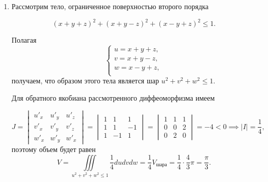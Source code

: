 \documentclass[../../main.tex]{subfiles}
\begin{document}
\begin{examples}
\begin{enumerate}
			\item Рассмотрим тело, ограниченное поверхностью второго порядка
			
			\[(x + y + z)^2 + (x + y - z)^2 + (x - y + z)^2 \leq 1.\]
			
			Полагая
			\[\begin{cases}
			u = x + y + z,\\
			v =  x + y - z,\\
			w = x - y + z,\\
			\end{cases}\]
			получаем, что образом этого тела является шар $u^2 + v^2 + w^2 \leq 1$.
			
			Для обратного якобиана рассмотренного диффеоморфизма имеем
			
			\[J = \begin{vmatrix}
			u'_x & u'_y & u'_z\\
			v'_x & v'_y & v'_z\\
			w'_x & w'_y & w'_x
			\end{vmatrix} =\begin{vmatrix}
			1 & 1 & 1\\
			1 & 1 & -1\\
			1 & -1 & 1
			\end{vmatrix} = \begin{vmatrix}
			1 & 1 & 1\\
			0 & 0 & 2\\
			0 & 2 & 0
			\end{vmatrix} = -4 < 0 \implies |I| = \frac{1}{4},\]
			поэтому объем будет равен
			\[V = \displaystyle \iiint\limits_{u^2 + v^2 +
				 w^2 \leq 1} \frac{1}{4} d u d v d w
			  = \frac{1}{4} V_{\text{шара}} = \frac{1}{4} \cdot \frac{4}{3}\pi 
			  = \frac{\pi}{3}.\]
		\end{enumerate}
	\end{examples}
\end{document}
